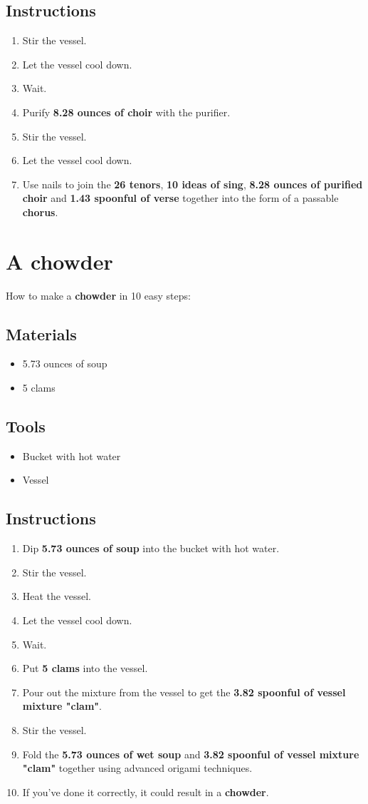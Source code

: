 \documentclass{article}
\begin{document}
\subsection{Instructions}\begin{enumerate}
\item 
Stir the vessel.
\item 
Let the vessel cool down.
\item 
Wait.
\item 
Purify \textbf{8.28 ounces of choir} with the purifier.
\item 
Stir the vessel.
\item 
Let the vessel cool down.
\item 
Use nails to join the \textbf{26 tenors}, \textbf{10 ideas of sing}, \textbf{8.28 ounces of purified choir} and \textbf{1.43 spoonful of verse} together into the form of a passable \textbf{chorus}.
\end{enumerate}
\newpage
\section{A chowder}How to make a \textbf{chowder} in 10 easy steps:

\subsection{Materials}\begin{itemize}
\item 
5.73 ounces of soup
\item 
5 clams
\end{itemize}
\subsection{Tools}\begin{itemize}
\item 
Bucket with hot water
\item 
Vessel
\end{itemize}
\subsection{Instructions}\begin{enumerate}
\item 
Dip \textbf{5.73 ounces of soup} into the bucket with hot water.
\item 
Stir the vessel.
\item 
Heat the vessel.
\item 
Let the vessel cool down.
\item 
Wait.
\item 
Put \textbf{5 clams} into the vessel.
\item 
Pour out the mixture from the vessel to get the \textbf{3.82 spoonful of vessel mixture "clam"}.
\item 
Stir the vessel.
\item 
Fold the \textbf{5.73 ounces of wet soup} and \textbf{3.82 spoonful of vessel mixture "clam"} together using advanced origami techniques.
\item 
If you've done it correctly, it could result in a \textbf{chowder}.
\end{enumerate}
\newpage
\end{document}

